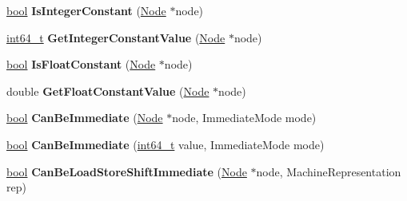 \begin{DoxyCompactItemize}
\item 
\mbox{\label{classv8_1_1internal_1_1compiler_1_1Arm64OperandGenerator_aa69f60c9702b367f05e1b0ba68440842}} 
\mbox{\hyperlink{classbool}{bool}} {\bfseries Is\+Integer\+Constant} (\mbox{\hyperlink{classv8_1_1internal_1_1compiler_1_1Node}{Node}} $\ast$node)
\item 
\mbox{\label{classv8_1_1internal_1_1compiler_1_1Arm64OperandGenerator_a7d722c9454c869b4805290eda03eb0ec}} 
\mbox{\hyperlink{classint64__t}{int64\+\_\+t}} {\bfseries Get\+Integer\+Constant\+Value} (\mbox{\hyperlink{classv8_1_1internal_1_1compiler_1_1Node}{Node}} $\ast$node)
\item 
\mbox{\label{classv8_1_1internal_1_1compiler_1_1Arm64OperandGenerator_a71914a8203678e368f20876843d4bc1d}} 
\mbox{\hyperlink{classbool}{bool}} {\bfseries Is\+Float\+Constant} (\mbox{\hyperlink{classv8_1_1internal_1_1compiler_1_1Node}{Node}} $\ast$node)
\item 
\mbox{\label{classv8_1_1internal_1_1compiler_1_1Arm64OperandGenerator_ae570be798733a54bcee9f559b3f7debc}} 
double {\bfseries Get\+Float\+Constant\+Value} (\mbox{\hyperlink{classv8_1_1internal_1_1compiler_1_1Node}{Node}} $\ast$node)
\item 
\mbox{\label{classv8_1_1internal_1_1compiler_1_1Arm64OperandGenerator_ac369443cd34e7d1c0fc3f0649824284e}} 
\mbox{\hyperlink{classbool}{bool}} {\bfseries Can\+Be\+Immediate} (\mbox{\hyperlink{classv8_1_1internal_1_1compiler_1_1Node}{Node}} $\ast$node, Immediate\+Mode mode)
\item 
\mbox{\label{classv8_1_1internal_1_1compiler_1_1Arm64OperandGenerator_a2f5538f12c78b7d3805620d55639021b}} 
\mbox{\hyperlink{classbool}{bool}} {\bfseries Can\+Be\+Immediate} (\mbox{\hyperlink{classint64__t}{int64\+\_\+t}} value, Immediate\+Mode mode)
\item 
\mbox{\label{classv8_1_1internal_1_1compiler_1_1Arm64OperandGenerator_aa4d12145139c5480a8e078ee7b86e2fb}} 
\mbox{\hyperlink{classbool}{bool}} {\bfseries Can\+Be\+Load\+Store\+Shift\+Immediate} (\mbox{\hyperlink{classv8_1_1internal_1_1compiler_1_1Node}{Node}} $\ast$node, Machine\+Representation rep)
\end{DoxyCompactItemize}
